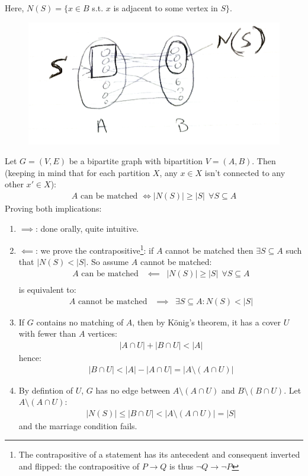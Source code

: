 Here, $N(S) = \{ x \in B $ s.t. $x$ is adjacent to some vertex in $S \}$.\\

\begin{figure}[h]
	\center
	\includegraphics[width=0.3\linewidth]{img/2-1.png}
\end{figure}  
Let $G = (V, E)$ be a bipartite graph with bipartition $V = (A, B)$. Then (keeping in mind that for each partition $X$, any $x \in X$ isn't connected to any other $x' \in X$):
\begin{eqnarray}
	A \text{ can be matched } \iff |N(S)| \geq |S| ~~\forall S \subseteq A
\end{eqnarray} 
Proving both implications:
\begin{enumerate}
	\item $\implies$: done orally, quite intuitive.
	\item $\impliedby$: we prove the contrapositive\footnote{The contrapositive of a statement has its antecedent and consequent inverted and flipped: the contrapositive of $P \rightarrow Q$ is thus $\neg Q \rightarrow \neg P$}: if $A$ cannot be matched then $\exists S \subseteq A$ such that $|N(S) < |S|$. So assume $A$ cannot be matched:
		\begin{eqnarray}
			A \text{ can be matched } &\impliedby& |N(S)| \geq |S| ~~\forall S \subseteq A \\
		\end{eqnarray}
		is equivalent to:
		\begin{eqnarray}
			A \text{ cannot be matched } &\implies& \exists S \subseteq A : N(S) < |S|
		\end{eqnarray} 
	\item If $G$ contains no matching of $A$, then by König's theorem, it has a cover $U$ with fewer than $A$ vertices:
		\begin{eqnarray}
			|A \cap U| + |B \cap U| < |A|
		\end{eqnarray}
		hence:
		\begin{eqnarray}
			|B \cap U| < |A| - |A \cap U| = |A \setminus (A \cap U)|
		\end{eqnarray}
	\item By defintion of $U$, $G$ has no edge between $A \setminus (A \cap U)$ and $B \setminus (B \cap U)$. Let $A \setminus (A \cap U)$:
		\begin{eqnarray}
			|N(S)| \leq |B \cap U| < |A \setminus (A \cap U)| = |S|
		\end{eqnarray} 
		and the marriage condition fails.
\end{enumerate}

